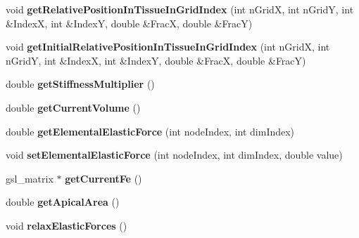 \begin{DoxyCompactItemize}
\item 
\hypertarget{classShapeBase_a13cf955dcc9db425c762053468578d72}{}void {\bfseries get\+Relative\+Position\+In\+Tissue\+In\+Grid\+Index} (int n\+Grid\+X, int n\+Grid\+Y, int \&Index\+X, int \&Index\+Y, double \&Frac\+X, double \&Frac\+Y)\label{classShapeBase_a13cf955dcc9db425c762053468578d72}

\item 
\hypertarget{classShapeBase_a2e91ece1ff8f6cfa8d8c495a3afc59c5}{}void {\bfseries get\+Initial\+Relative\+Position\+In\+Tissue\+In\+Grid\+Index} (int n\+Grid\+X, int n\+Grid\+Y, int \&Index\+X, int \&Index\+Y, double \&Frac\+X, double \&Frac\+Y)\label{classShapeBase_a2e91ece1ff8f6cfa8d8c495a3afc59c5}

\item 
\hypertarget{classShapeBase_aedf8b080646ee417af28e94f5857aa17}{}double {\bfseries get\+Stiffness\+Multiplier} ()\label{classShapeBase_aedf8b080646ee417af28e94f5857aa17}

\item 
\hypertarget{classShapeBase_a438155adad0f124efa714b349830437b}{}double {\bfseries get\+Current\+Volume} ()\label{classShapeBase_a438155adad0f124efa714b349830437b}

\item 
\hypertarget{classShapeBase_adf6c972d40af4b6709481f63903c4342}{}double {\bfseries get\+Elemental\+Elastic\+Force} (int node\+Index, int dim\+Index)\label{classShapeBase_adf6c972d40af4b6709481f63903c4342}

\item 
\hypertarget{classShapeBase_ae4d82f91854fff8473dcd722ab423e10}{}void {\bfseries set\+Elemental\+Elastic\+Force} (int node\+Index, int dim\+Index, double value)\label{classShapeBase_ae4d82f91854fff8473dcd722ab423e10}

\item 
\hypertarget{classShapeBase_abb8aa4fb16ea7b545e6b8e13b95d6b6e}{}gsl\+\_\+matrix $\ast$ {\bfseries get\+Current\+Fe} ()\label{classShapeBase_abb8aa4fb16ea7b545e6b8e13b95d6b6e}

\item 
\hypertarget{classShapeBase_a5b8f0f737818ca01e15b7652c38d4900}{}double {\bfseries get\+Apical\+Area} ()\label{classShapeBase_a5b8f0f737818ca01e15b7652c38d4900}

\item 
\hypertarget{classShapeBase_a40a3c680c1b96ae81d6bfe21a0127655}{}void {\bfseries relax\+Elastic\+Forces} ()\label{classShapeBase_a40a3c680c1b96ae81d6bfe21a0127655}


\end{DoxyCompactItemize}
